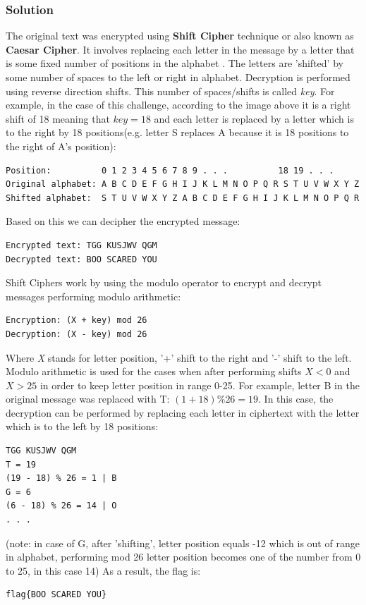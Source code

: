 \documentclass[11 pt]{article}
\begin{document}
\subsubsection{Solution}
The original text was encrypted using \textbf{Shift Cipher} technique or also known as \textbf{Caesar Cipher}. It involves replacing each letter in the message by a letter that is some fixed number of positions in the alphabet \cite{Shift Cipher}. The letters are 'shifted' by some number of spaces to the left or right in alphabet. Decryption is performed using reverse direction shifts. This number of spaces/shifts is called \textit{key}. For example, in the case of this challenge, according to the image above it is a right shift of 18 meaning that $key = 18$ and each letter is replaced by a letter which is to the right by 18 positions(e.g. letter S replaces A because it is 18 positions to the right of A's position):
\begin{lstlisting}
Position:          0 1 2 3 4 5 6 7 8 9 . . .          18 19 . . .
Original alphabet: A B C D E F G H I J K L M N O P Q R S T U V W X Y Z
Shifted alphabet:  S T U V W X Y Z A B C D E F G H I J K L M N O P Q R
\end{lstlisting}
Based on this we can decipher the encrypted message:
\begin{lstlisting}
Encrypted text: TGG KUSJWV QGM
Decrypted text: BOO SCARED YOU
\end{lstlisting}
Shift Ciphers work by using the modulo operator to encrypt and decrypt messages performing modulo arithmetic:
\begin{lstlisting}
Encryption: (X + key) mod 26
Decryption: (X - key) mod 26
\end{lstlisting}
Where \textit{X} stands for letter position, '+' shift to the right and '-' shift to the left. Modulo arithmetic is used for the cases when after performing shifts $X<0$ and $X>25$ in order to keep letter position in range 0-25. For example, letter B in the original message was replaced with T: $(1 + 18) \% 26 = 19$. In this case, the decryption can be performed by replacing each letter in ciphertext with the letter which is to the left by 18 positions:
\begin{lstlisting}
TGG KUSJWV QGM
T = 19
(19 - 18) % 26 = 1 | B
G = 6
(6 - 18) % 26 = 14 | O
. . .
\end{lstlisting}
(note: in case of G, after 'shifting', letter position equals -12 which is out of range in alphabet, performing mod 26 letter position becomes one of the number from 0 to 25, in this case 14)
\newline
As a result, the flag is:
\begin{lstlisting}
flag{BOO SCARED YOU}
\end{lstlisting}
\end{document}
